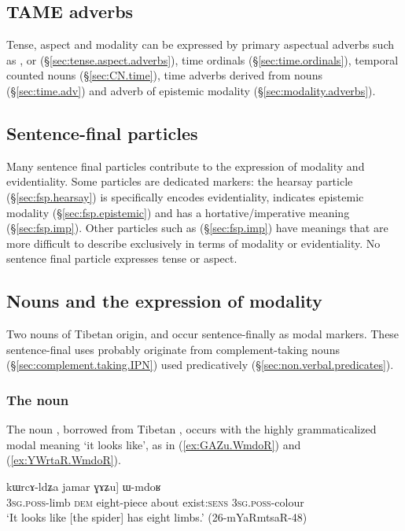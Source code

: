 \subsection{TAME adverbs} 
Tense, aspect and modality can be expressed by primary aspectual adverbs such as ,  or  (§\ref{sec:tense.aspect.adverbs}), time ordinals (§\ref{sec:time.ordinals}), temporal counted nouns (§\ref{sec:CN.time}), time adverbs derived from nouns (§\ref{sec:time.adv}) and adverb of epistemic modality (§\ref{sec:modality.adverbs}).


\subsection{Sentence-final particles} 
Many sentence final particles contribute to the expression of modality and evidentiality. Some particles are dedicated markers: the hearsay particle  (§\ref{sec:fsp.hearsay}) is specifically encodes evidentiality,   indicates epistemic modality (§\ref{sec:fsp.epistemic}) and  has a hortative/imperative meaning (§\ref{sec:fsp.imp}). Other particles such as  (§\ref{sec:fsp.imp}) have meanings that are more difficult to describe exclusively in terms of modality or evidentiality. No sentence final particle expresses tense or aspect.


\subsection{Nouns and the expression of modality} \label{sec:nouns.TAME}
Two nouns of Tibetan origin,  and  occur sentence-finally as modal markers. These sentence-final uses probably originate from complement-taking nouns (§\ref{sec:complement.taking.IPN}) used predicatively (§\ref{sec:non.verbal.predicates}).

\subsubsection{The noun  } \label{sec:WmdoR.TAME}
The noun , borrowed from Tibetan , occurs with the highly grammaticalized modal meaning `it looks like', as in (\ref{ex:GAZu.WmdoR}) and (\ref{ex:YWrtaR.WmdoR}).  


\begin{exe}
	\ex \label{ex:GAZu.WmdoR}
	\gll [ɯ-mɤlɤjaʁ nɯ, [...] kɯrcɤ-ldʑa jamar ɣɤʑu] ɯ-mdoʁ \\
	\textsc{3sg}.\textsc{poss}-limb \textsc{dem} { } eight-piece about exist:\textsc{sens} \textsc{3sg}.\textsc{poss}-colour \\
	\glt `It looks like [the spider] has eight limbs.' (26-mYaRmtsaR-48)
\end{exe}

